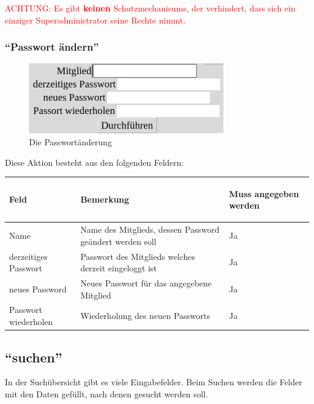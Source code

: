 \textcolor{red}{ACHTUNG: Es gibt \textbf{keinen} Schutzmechanisums, der verhindert, dass sich ein einziger Superadministrator seine Rechte nimmt.}


\subsubsection{``Passwort ändern''}
\label{subsubsec:detail:edit:change_password}
\begin{figure}\includegraphics{images/gui2/change_password.jpg}\caption{Die Passwortänderung}\label{fig:change_password}\end{figure}

Diese Aktion besteht aus den folgenden Feldern:

\begin{tabular}{|p{}|p{}|p{}|}\hline
\begin{center}Feld\end{center} & \begin{center}Bemerkung\end{center} & \begin{center}Muss angegeben werden\end{center}\\
\hline
Name & Name des Mitglieds, dessen Password geändert werden soll & Ja\\
\hline
derzeitiges Passwort & Passwort des Mitglieds welches derzeit eingeloggt ist & Ja\\
\hline
neues Password & Neues Passwort für das angegebene Mitglied & Ja\\
\hline
Passwort wiederholen & Wiederholung des neuen Passworts & Ja\\
\hline
\end{tabular}


\subsection{``suchen''}
\label{subsec:detail:search}
In der Suchübersicht gibt es viele Eingabefelder. Beim Suchen werden die Felder mit den Daten gefüllt, nach denen gesucht werden soll.

